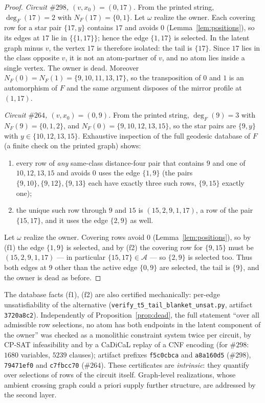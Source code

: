 \begin{proof}
\emph{Circuit \(\#298\), \((v,x_0)=(0,17)\).} From the printed string,
\(\deg_F(17)=2\) with \(N_F(17)=\{0,1\}\). Let \(\omega\) realize the
owner. Each covering row for a star pair \(\{17,y\}\) contains \(17\)
and avoids \(0\) (Lemma~\ref{lem:positions}), so its edges at \(17\)
lie in \(\{\{1,17\}\}\); hence the edge \(\{1,17\}\) is selected. In
the latent graph minus \(v\), the vertex \(17\) is therefore isolated:
the tail is \(\{17\}\). Since \(17\) lies in the class opposite
\(v\), it is not an atom-partner of \(v\), and no atom lies inside a
single vertex. The owner is dead. Moreover
\(N_F(0)=N_F(1)=\{9,10,11,13,17\}\), so the transposition of \(0\) and
\(1\) is an automorphism of \(F\) and the same argument disposes of
the mirror profile at \((1,17)\).

\emph{Circuit \(\#264\), \((v,x_0)=(0,9)\).} From the printed string,
\(\deg_F(9)=3\) with \(N_F(9)=\{0,1,2\}\), and
\(N_F(0)=\{9,10,12,13,15\}\), so the star pairs are \(\{9,y\}\) with
\(y\in\{10,12,13,15\}\). Exhaustive inspection of the full geodesic
database of \(F\) (a finite check on the printed graph) shows:
\begin{enumerate}[label=\textup{(f\arabic*)}]
\item every row of \emph{any} same-class distance-four pair that
contains \(9\) and one of \(10,12,13,15\) and avoids \(0\) uses the
edge \(\{1,9\}\) (the pairs \(\{9,10\},\{9,12\},\{9,13\}\) each have
exactly three such rows, \(\{9,15\}\) exactly one);
\item the unique such row through \(9\) and \(15\) is
\((15,2,9,1,17)\), a row of the pair \(\{15,17\}\), and it uses the
edge \(\{2,9\}\) as well.
\end{enumerate}
Let \(\omega\) realize the owner. Covering rows avoid \(0\)
(Lemma~\ref{lem:positions}), so by (f1) the edge \(\{1,9\}\) is
selected, and by (f2) the covering row for \(\{9,15\}\) must be
\((15,2,9,1,17)\) --- in particular \(\{15,17\}\in\mathcal A\) --- so
\(\{2,9\}\) is selected too. Thus both edges at \(9\) other than the
active edge \(\{0,9\}\) are selected, the tail is \(\{9\}\), and the
owner is dead as before.
\end{proof}

The database facts (f1), (f2) are also certified mechanically:
per-edge unsatisfiability of the alternative
(\texttt{verify\_t5\_tail\_blanket\_unsat.py}, artifact
\texttt{3720a8c2}). Independently of Proposition~\ref{prop:dead}, the
full statement ``over all admissible row selections, no atom has both
endpoints in the latent component of the owner'' was checked as a
monolithic constraint system twice per circuit, by CP-SAT infeasibility
and by a CaDiCaL replay of a CNF encoding (for \(\#298\): \(1680\)
variables, \(5239\) clauses); artifact prefixes \texttt{f5c0cbca} and
\texttt{a8a160d5} (\(\#298\)), \texttt{79471ef0} and \texttt{c7fbcc70}
(\(\#264\)). These
certificates are \emph{intrinsic}: they quantify over selections of
rows of the circuit itself. Graph-level realizations, whose ambient
crossing graph could a priori supply further structure, are addressed
by the second layer.


